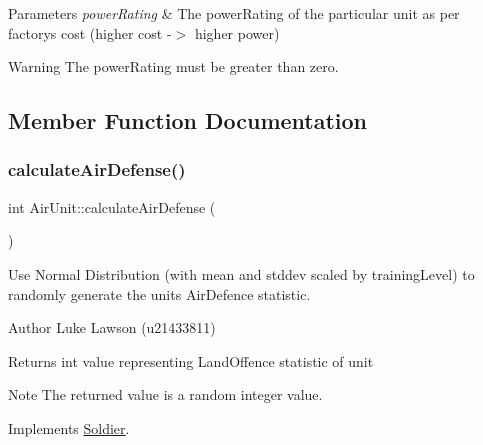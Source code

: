\begin{DoxyParams}{Parameters}
{\em power\+Rating} & The power\+Rating of the particular unit as per factory\textquotesingle{}s cost (higher cost -\/$>$ higher power) \\
\hline
\end{DoxyParams}
\begin{DoxyWarning}{Warning}
The power\+Rating must be greater than zero. 
\end{DoxyWarning}


\subsection{Member Function Documentation}
\mbox{\label{class_air_unit_a78796cdf870a76c072e89445a4c8ba15}} 
\subsubsection{\texorpdfstring{calculateAirDefense()}{calculateAirDefense()}}
{\footnotesize\ttfamily int Air\+Unit\+::calculate\+Air\+Defense (\begin{DoxyParamCaption}{ }\end{DoxyParamCaption})\hspace{0.3cm}{\ttfamily [virtual]}}



Use Normal Distribution (with mean and stddev scaled by training\+Level) to randomly generate the unit\textquotesingle{}s Air\+Defence statistic. 

\begin{DoxyAuthor}{Author}
Luke Lawson (u21433811) 
\end{DoxyAuthor}
\begin{DoxyReturn}{Returns}
int value representing Land\+Offence statistic of unit 
\end{DoxyReturn}
\begin{DoxyNote}{Note}
The returned value is a random integer value. 
\end{DoxyNote}


Implements \mbox{\hyperlink{class_soldier_a3dc2d7a06621380c4561d330d5359dc2}{Soldier}}.

\mbox{\label{class_air_unit_a522f54b197f6b2daf784f4a9eacb9edc}} 
